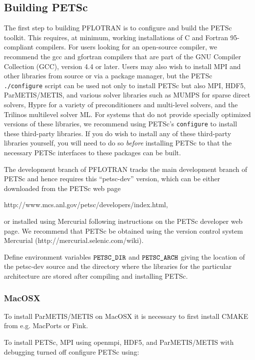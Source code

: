 \documentclass[12pt]{article}
\begin{document}
\subsection{Building PETSc}

The first step to building PFLOTRAN is to configure and build the PETSc 
toolkit.
This requires, at minimum, working installations of C and Fortran 95-compliant 
compilers.
For users looking for an open-source compiler, we recommend the gcc and 
gfortran compilers that are part of the GNU Compiler Collection (GCC), version 
4.4 or later.
Users may also wish to install MPI and other libraries from source or via a 
package manager, but the PETSc {\tt ./configure} script can be used not only 
to install PETSc but also MPI, HDF5, ParMETIS/METIS, and various solver 
libraries such as MUMPS for sparse direct solvers, Hypre for a variety of 
preconditioners and multi-level solvers, and the Trilinos multilevel solver ML. 
For systems that do not provide specially optimized versions of these 
libraries, we recommend using PETSc's {\tt configure} to install these 
third-party libraries.
If you do wish to install any of these third-party libraries yourself, you 
will need to do so {\it before} installing PETSc to that the necessary PETSc 
interfaces to these packages can be built.

The development branch of PFLOTRAN tracks the main development branch of 
PETSc and hence requires this ``petsc-dev'' version, which can be either 
downloaded from the PETSc web page 

http://www.mcs.anl.gov/petsc/developers/index.html, 

\noindent
or installed using Mercurial following instructions on the PETSc developer web 
page. 
We recommend that PETSc be obtained using the version control system Mercurial 
(http://mercurial.selenic.com/wiki).

Define environment variables $\verb|PETSC_DIR|$ and $\verb|PETSC_ARCH|$ giving the location of the petsc-dev source and the directory where the libraries for the particular architecture are stored after compiling and installing PETSc.

\subsubsection{MacOSX}

To install ParMETIS/METIS on MacOSX it is necessary to first install CMAKE from e.g. MacPorts or Fink.

To install PETSc, MPI using openmpi, HDF5, and ParMETIS/METIS with debugging turned off configure PETSc using:
\end{document}
